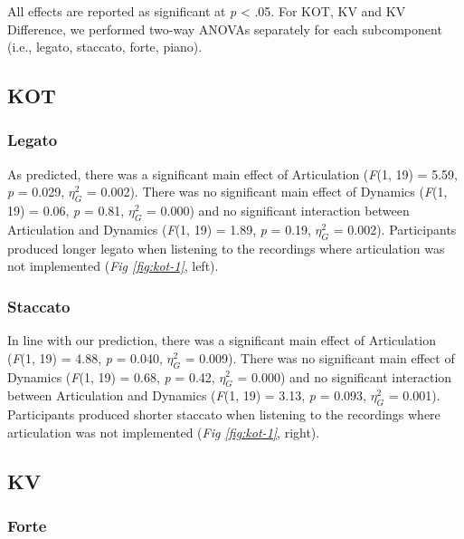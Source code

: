 \documentclass[
  man,floatsintext]{apa6}
\begin{document}
All effects are reported as significant at \emph{p} \textless{} .05. For KOT, KV and KV Difference, we performed two-way ANOVAs separately for each subcomponent (i.e., legato, staccato, forte, piano).

\hypertarget{kot}{%
\subsection{KOT}\label{kot}}

\hypertarget{legato}{%
\subsubsection{Legato}\label{legato}}

As predicted, there was a significant main effect of Articulation (\emph{F}(1, 19) = 5.59, \emph{p} = 0.029, \(\eta_G^2\) = 0.002). There was no significant main effect of Dynamics (\emph{F}(1, 19) = 0.06, \emph{p} = 0.81, \(\eta_G^2\) = 0.000) and no significant interaction between Articulation and Dynamics (\emph{F}(1, 19) = 1.89, \emph{p} = 0.19, \(\eta_G^2\) = 0.002). Participants produced longer legato when listening to the recordings where articulation was not implemented (\emph{Fig \ref{fig:kot-1}}, left).

\hypertarget{staccato}{%
\subsubsection{Staccato}\label{staccato}}

In line with our prediction, there was a significant main effect of Articulation (\emph{F}(1, 19) = 4.88, \emph{p} = 0.040, \(\eta_G^2\) = 0.009). There was no significant main effect of Dynamics (\emph{F}(1, 19) = 0.68, \emph{p} = 0.42, \(\eta_G^2\) = 0.000) and no significant interaction between Articulation and Dynamics (\emph{F}(1, 19) = 3.13, \emph{p} = 0.093, \(\eta_G^2\) = 0.001). Participants produced shorter staccato when listening to the recordings where articulation was not implemented (\emph{Fig \ref{fig:kot-1}}, right).

\hypertarget{kv}{%
\subsection{KV}\label{kv}}

\hypertarget{forte}{%
\subsubsection{Forte}\label{forte}}
\end{document}
